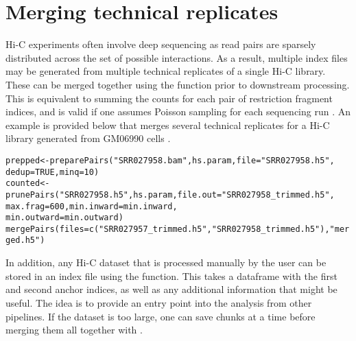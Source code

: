 \documentclass{report}\usepackage[]{graphicx}\usepackage[usenames,dvipsnames]{color}
\newcommand{\hlnum}[1]{\textcolor[rgb]{0.816,0.125,0.439}{#1}}%
\newcommand{\hlstr}[1]{\textcolor[rgb]{0.251,0.627,0.251}{#1}}%
\newcommand{\hlstd}[1]{\textcolor[rgb]{0.251,0.251,0.251}{#1}}%
\newcommand{\hlkwb}[1]{\textcolor[rgb]{0,0,0}{#1}}%
\newcommand{\hlkwc}[1]{\textcolor[rgb]{0.251,0.251,0.251}{#1}}%
\newcommand{\hlkwd}[1]{\textcolor[rgb]{0.878,0.439,0.125}{#1}}%
\newenvironment{knitrout}{}{} %
\begin{document}
\section{Merging technical replicates}
Hi-C experiments often involve deep sequencing as read pairs are sparsely distributed across the set of possible interactions.
As a result, multiple index files may be generated from multiple technical replicates of a single Hi-C library.
These can be merged together using the  function prior to downstream processing.
This is equivalent to summing the counts for each pair of restriction fragment indices, and is valid if one assumes Poisson sampling for each sequencing run \cite{marioni2008rnaseq}.
An example is provided below that merges several technical replicates for a Hi-C library generated from GM06990 cells \cite{lieberman2009comprehensive}. 

\begin{knitrout}
\color{fgcolor}\begin{kframe}
\begin{alltt}
\hlstd{prepped} \hlkwb{<-} \hlkwd{preparePairs}\hlstd{(}\hlstr{"SRR027958.bam"}\hlstd{, hs.param,} \hlkwc{file}\hlstd{=}\hlstr{"SRR027958.h5"}\hlstd{,}
                        \hlkwc{dedup}\hlstd{=}\hlnum{TRUE}\hlstd{,} \hlkwc{minq}\hlstd{=}\hlnum{10}\hlstd{)}
\hlstd{counted} \hlkwb{<-} \hlkwd{prunePairs}\hlstd{(}\hlstr{"SRR027958.h5"}\hlstd{, hs.param,} \hlkwc{file.out}\hlstd{=}\hlstr{"SRR027958_trimmed.h5"}\hlstd{,}
                      \hlkwc{max.frag}\hlstd{=}\hlnum{600}\hlstd{,} \hlkwc{min.inward}\hlstd{=min.inward,}
                      \hlkwc{min.outward}\hlstd{=min.outward)}
\hlkwd{mergePairs}\hlstd{(}\hlkwc{files}\hlstd{=}\hlkwd{c}\hlstd{(}\hlstr{"SRR027957_trimmed.h5"}\hlstd{,} \hlstr{"SRR027958_trimmed.h5"}\hlstd{),} \hlstr{"merged.h5"}\hlstd{)}
\end{alltt}
\end{kframe}
\end{knitrout}

In addition, any Hi-C dataset that is processed manually by the user can be stored in an index file using the  function.
This takes a dataframe with the first and second anchor indices, as well as any additional information that might be useful.
The idea is to provide an entry point into the  analysis from other pipelines.
If the dataset is too large, one can save chunks at a time before merging them all together with .
\end{document}
